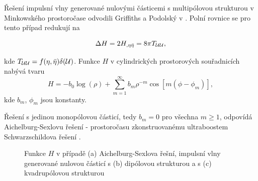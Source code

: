 Řešení impulsní vlny generované nulovými částicemi s multipólovou strukturou v Minkowského prostoročase odvodili
Griffiths a Podolský v \cite{Griffiths_1997}. Polní rovnice se pro tento případ redukují na

\begin{equation}
    \label{eq:podminka_na_H}
    \Delta H = 2 H_{,\eta \bar{\eta}} = 8 \pi T_{\mathcal{U} \mathcal{U}},
\end{equation}
 
kde $T_{\mathcal{U} \mathcal{U}} = f(\eta, \bar{\eta}) \delta(\mathcal{U})$. Funkce $H$ v cylindrických prostorových souřadnicích nabývá tvaru 
\begin{equation}
    \label{eq:multipole_minkowski}
    H = -b_0 \log(\rho) + \sum_{m=1}^\infty b_m \rho^{-m} \cos\left[ m \left(\phi - \phi_m \right) \right],
\end{equation}
kde $b_m$, $\phi_m$ jsou konstanty.

Řešení s jedinou monopólovou částicí, tedy $b_m=0$ pro všechna $m \geq 1$, odpovídá Aichelburg-Sexlovu řešení - prostoročasu
zkonstruovanému ultraboostem Schwarzschildova řešení \cite{Aichelburg_1971}.

\begin{figure}[h]
    \centering
    \begin{subfigure}[b]{0.31\textwidth}
       \caption{}
    \end{subfigure}
     \hfill
     \begin{subfigure}[b]{0.31\textwidth}
       \caption{}
     \end{subfigure}
     \hfill
     \begin{subfigure}[b]{0.31\textwidth}
       \caption{}
     \end{subfigure}

    \caption{Funkce $H$ v případě (a) Aichelburg-Sexlova řešní, impulsní vlny generované nulovou částicí s (b) dipólovou strukturou a s (c) kvadrupólovou strukturou}
\end{figure}

